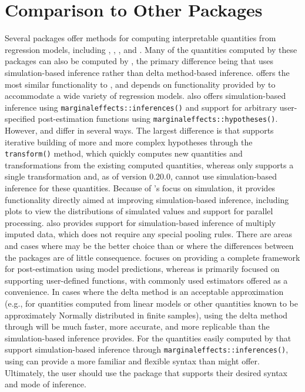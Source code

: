 \section{Comparison to Other Packages}\label{comparison-to-other-packages}
Several packages offer methods for computing interpretable quantities from regression models, including  \citep{emmeans2024},  \citep{margins2021},  \citep{modelbased2020}, and  \citep{marginaleffectsforthcoming}. Many of the quantities computed by these packages can also be computed by , the primary difference being that  uses simulation-based inference rather than delta method-based inference.
 offers the most similar functionality to , and  depends on functionality provided by  to accommodate a wide variety of regression models.  also offers simulation-based inference using \texttt{marginaleffects::inferences()} and support for arbitrary user-specified post-estimation functions using \texttt{marginaleffects::hypotheses()}. However,  and  differ in several ways. The largest difference is that  supports iterative building of more and more complex hypotheses through the \texttt{transform()} method, which quickly computes new quantities and transformations from the existing computed quantities, whereas  only supports a single transformation and, as of version 0.20.0, cannot use simulation-based inference for these quantities.
Because of 's focus on simulation, it provides functionality directly aimed at improving simulation-based inference, including plots to view the distributions of simulated values and support for parallel processing.  also provides support for simulation-based inference of multiply imputed data, which does not require any special pooling rules.
There are areas and cases where  may be the better choice than  or where the differences between the packages are of little consequence.  focuses on providing a complete framework for post-estimation using model predictions, whereas  is primarily focused on supporting user-defined functions, with commonly used estimators offered as a convenience. In cases where the delta method is an acceptable approximation (e.g., for quantities computed from linear models or other quantities known to be approximately Normally distributed in finite samples), using the delta method through  will be much faster, more accurate, and more replicable than the simulation-based inference  provides. For the quantities easily computed by  that support simulation-based inference through \texttt{marginaleffects::inferences()}, using  can provide a more familiar and flexible syntax than  might offer. Ultimately, the user should use the package that supports their desired syntax and mode of inference.
